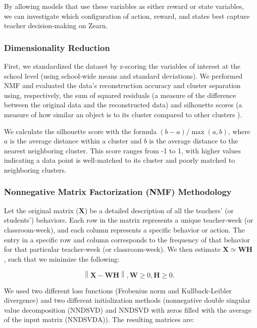 \documentclass[
  number,
  preprint,
  3p,
  onecolumn]{elsarticle}
\begin{document}
By allowing models that use these variables as either reward or state
variables, we can investigate which configuration of action, reward, and
states best capture teacher decision-making on Zearn.

\subsubsection{Dimensionality
Reduction}\label{dimensionality-reduction-1}

First, we standardized the dataset by z-scoring the variables of
interest at the school level (using school-wide means and standard
deviations). We performed NMF and evaluated the data's reconstruction
accuracy and cluster separation using, respectively, the sum of squared
residuals (a measure of the difference between the original data and the
reconstructed data) and silhouette scores (a measure of how similar an
object is to its cluster compared to other clusters
\citep{rousseeuw1987}).

We calculate the silhouette score with the formula
\((b - a) / \max(a, b)\), where \(a\) is the average distance within a
cluster and \(b\) is the average distance to the nearest neighboring
cluster. This score ranges from -1 to 1, with higher values indicating a
data point is well-matched to its cluster and poorly matched to
neighboring clusters.

\subsubsection{Nonnegative Matrix Factorization (NMF)
Methodology}\label{nonnegative-matrix-factorization-nmf-methodology}

Let the original matrix (\(\mathbf{X}\)) be a detailed description of
all the teachers' (or students') behaviors. Each row in the matrix
represents a unique teacher-week (or classroom-week), and each column
represents a specific behavior or action. The entry in a specific row
and column corresponds to the frequency of that behavior for that
particular teacher-week (or classroom-week). We then estimate
\(\mathbf{X} \simeq \mathbf{W}\mathbf{H}\), such that we minimize the
following:

\[
\left\| \mathbf{X} - \mathbf{W}\mathbf{H} \right\| , \mathbf{W} \geq 0, \mathbf{H} \geq 0.
\]

We used two different loss functions (Frobenius norm and
Kullback-Leibler divergence) and two different initialization methods
(nonnegative double singular value decomposition (NNDSVD) and NNDSVD
with zeros filled with the average of the input matrix (NNDSVDA)). The
resulting matrices are:
\end{document}

